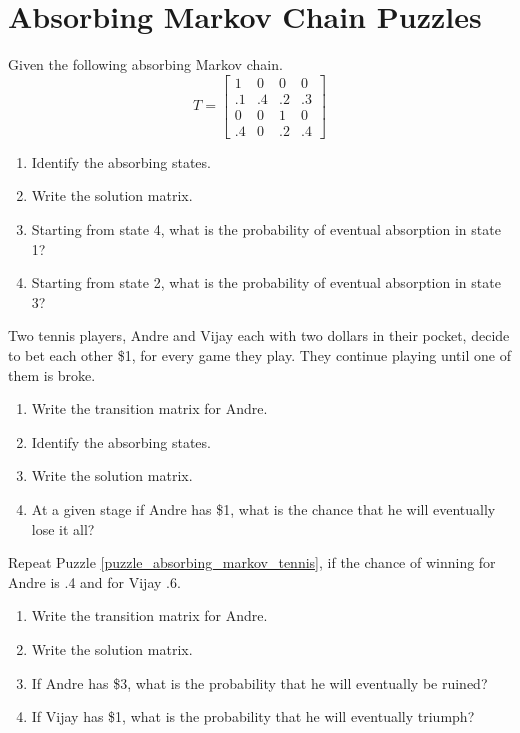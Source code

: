 \section{Absorbing Markov Chain Puzzles}

\begin{puzzle}
    Given the following absorbing Markov chain.
    \[
        T = \begin{bmatrix}
            1  & 0  & 0  & 0  \\
            .1 & .4 & .2 & .3 \\
            0  & 0  & 1  & 0  \\
            .4 & 0  & .2 & .4
        \end{bmatrix}
    \]
    \begin{enumerate}
        \item Identify the absorbing states.
        \item Write the solution matrix.
        \item Starting from state 4, what is the probability of eventual absorption in state 1?
        \item Starting from state 2, what is the probability of eventual absorption in state 3?
    \end{enumerate}
\end{puzzle}

\begin{puzzle}\label{puzzle_absorbing_markov_tennis}
    Two tennis players, Andre and Vijay each with two dollars in their pocket, decide to bet each other \$1, for every game they play. They continue playing until one of them is broke.
    \begin{enumerate}
        \item Write the transition matrix for Andre.
        \item Identify the absorbing states.
        \item Write the solution matrix.
        \item At a given stage if Andre has \$1, what is the chance that he will eventually lose it all?
    \end{enumerate}
\end{puzzle}


\begin{puzzle}
    Repeat Puzzle \ref{puzzle_absorbing_markov_tennis}, if the chance of winning for Andre is .4 and for Vijay .6.
    \begin{enumerate}
        \item Write the transition matrix for Andre.
        \item Write the solution matrix.
        \item If Andre has \$3, what is the probability that he will eventually be ruined?
        \item If Vijay has \$1, what is the probability that he will eventually triumph?
    \end{enumerate}
\end{puzzle}

